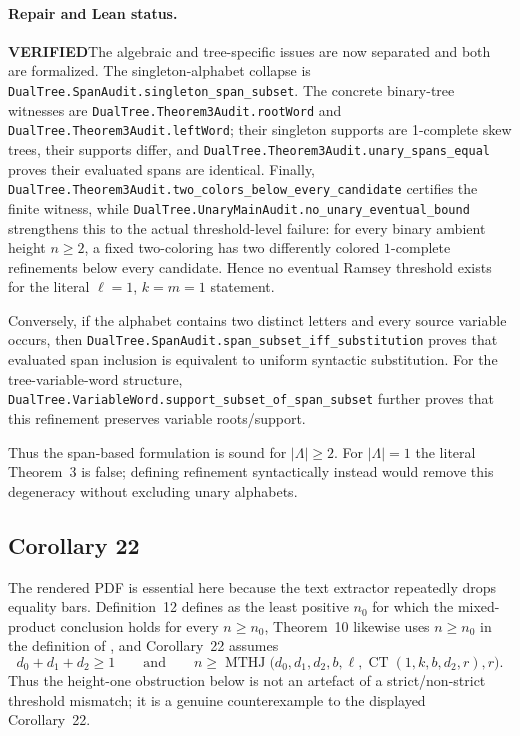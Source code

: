 \documentclass[11pt]{article}
\newcommand{\ok}{\textcolor{green!40!black}{\textbf{VERIFIED}}}
\newcommand{\lean}[1]{\texttt{#1}}
\begin{document}
\paragraph{Repair and Lean status.}
\ok The algebraic and tree-specific issues are now separated and both are
formalized.  The singleton-alphabet collapse is
\lean{DualTree.SpanAudit.singleton_span_subset}.  The concrete binary-tree
witnesses are \lean{DualTree.Theorem3Audit.rootWord} and
\lean{DualTree.Theorem3Audit.leftWord}; their singleton supports are
1-complete skew trees, their supports differ, and
\lean{DualTree.Theorem3Audit.unary_spans_equal} proves their evaluated spans
are identical.  Finally,
\lean{DualTree.Theorem3Audit.two_colors_below_every_candidate} certifies the
finite witness, while
\lean{DualTree.UnaryMainAudit.no_unary_eventual_bound} strengthens this to
the actual threshold-level failure: for every binary ambient height $n\ge2$,
a fixed two-coloring has two differently colored $1$-complete refinements
below every candidate.  Hence no eventual Ramsey threshold exists for the
literal $\ell=1$, $k=m=1$ statement.

Conversely, if the alphabet contains two distinct letters and every source
variable occurs, then
\lean{DualTree.SpanAudit.span_subset_iff_substitution} proves that evaluated
span inclusion is equivalent to uniform syntactic substitution.  For the
tree-variable-word structure,
\lean{DualTree.VariableWord.support_subset_of_span_subset} further proves
that this refinement preserves variable roots/support.

Thus the span-based formulation is sound for $|\Lambda|\ge2$.  For
$|\Lambda|=1$ the literal Theorem~3 is false; defining refinement
syntactically instead would remove this degeneracy without excluding unary
alphabets.

\subsection{Corollary 22}
The rendered PDF is essential here because the text extractor repeatedly drops
equality bars.  Definition~12 defines
 as the least positive $n_0$ for which the mixed-product
conclusion holds for every $n\ge n_0$, Theorem~10 likewise uses
$n\ge n_0$ in the definition of , and Corollary~22 assumes
\[
d_0+d_1+d_2\ge1
\qquad\text{and}\qquad
n\ge
\operatorname{MTHJ}\bigl(d_0,d_1,d_2,b,\ell,
\operatorname{CT}(1,k,b,d_2,r),r\bigr).
\]
Thus the height-one obstruction below is not an artefact of a strict/non-strict
threshold mismatch; it is a genuine counterexample to the displayed
Corollary~22.
\end{document}
